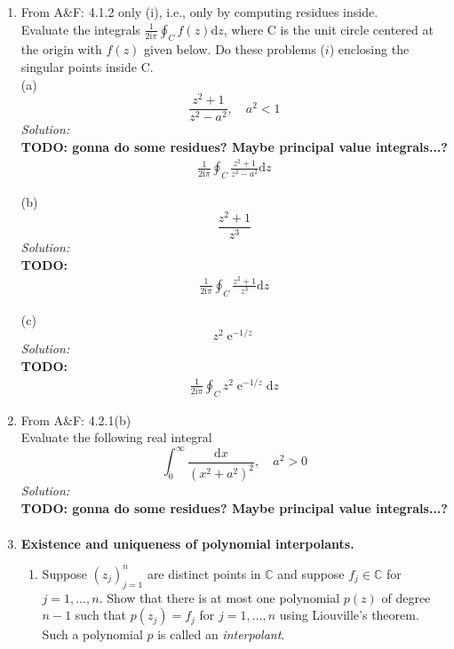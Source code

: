 \documentclass[10pt]{amsart}
\newcommand{\D}{\mathrm{d}}
\newcommand{\I}{\mathrm{i}}
\DeclareMathOperator{\E}{e}
\theoremstyle{nonumberplain}
\begin{document}
\mline
\begin{enumerate}[label={\bf {\arabic*}:}]
\item From A\&F: 4.1.2 only (i), i.e., only by computing residues inside.\\
Evaluate the integrals $\frac 1 {2 \I \pi} \oint_C f(z) \D z$, where C is the unit circle centered at the origin with $f(z)$ given below.
Do these problems ($i$) enclosing the singular points inside C. \\

\noindent
(a)
$$
\frac {z^2 + 1}{ z^2 - a^2 }, \quad a^2 < 1
$$
\textit{Solution:} \\
\textbf{TODO: gonna do some residues? Maybe principal value integrals...?}
\begin{align*}
\frac 1 {2 \I \pi} \oint_C \frac {z^2 + 1}{ z^2 - a^2 } \D z
\end{align*}

\noindent
(b)
$$
\frac {z^2 + 1}{ z^3 }
$$
\textit{Solution:} \\
\textbf{TODO:}
\begin{align*}
\frac 1 {2 \I \pi} \oint_C \frac {z^2 + 1}{ z^3 } \D z
\end{align*}

\noindent
(c)
$$
z^2\E^{-1/z}
$$
\textit{Solution:} \\
\textbf{TODO:}
\begin{align*}
\frac 1 {2 \I \pi} \oint_C z^2\E^{-1/z} \D z
\end{align*}

\newpage


\item From A\&F: 4.2.1(b)\\
Evaluate the following real integral
$$
\int_0^\infty \frac {\D x}{ (x^2 + a^2)^2 }, \quad a^2 > 0
$$
\textit{Solution:} \\
\textbf{TODO: gonna do some residues? Maybe principal value integrals...?}
\begin{align*}
\end{align*}

\newpage


\item  \textbf{Existence and uniqueness of polynomial interpolants.}
\begin{enumerate}
\item Suppose $(z_j)_{j = 1}^n$ are distinct points in $\mathbb C$ and suppose $f_j \in \mathbb C$ for $j = 1,\ldots,n$.
Show that there is at most one polynomial $p(z)$ of degree $n-1$ such that $p(z_j) = f_j$ for $j = 1,\ldots,n$ using Liouville's theorem.
Such a polynomial $p$ is called an \emph{interpolant}. \\


\end{enumerate}
\end{enumerate}
\end{document}
